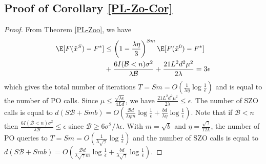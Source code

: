 \noindent\subsection{Proof of Corollary \ref{PL-Zo-Cor}}
\begin{proof}
From Theorem \ref{PL-Zoo}, we have
\begin{align}
\E[F(\tilde{x}^S) - {F}^*] & \leq   \left(1-\frac{\lambda\eta}{3}\right)^{Sm} \E[F(\tilde{x}^0) - {F}^*] \notag\\
&+ \frac{6I(\mathcal{B} < n) \sigma ^2}{\lambda\mathcal{B}}+\frac{21 L^2 d^2 \mu^2}{2\lambda}= 3 \epsilon\notag
\end{align}
which gives the total number of iterations $T = Sm = O(\frac{1}{\lambda\eta}\log\frac{1}{\epsilon})$ and is equal to the number of PO calls. Since $\mu \leq \frac{\sqrt{\lambda\epsilon}}{4 L d}$, we have $\frac{21 L^2 d^2 \mu^2}{2\lambda} \leq \epsilon$. The number of SZO calls is equal to $d(S\mathcal{B}+Smb) = O(\frac{\mathcal{B}d}{\lambda\eta m}\log\frac{1}{\epsilon}+\frac{bd}{\lambda\eta}\log\frac{1}{\epsilon})$.  Note that if $\mathcal{B} < n$ then $\frac{6I(\mathcal{B} < n) \sigma ^2}{\lambda\mathcal{B}} \leq \epsilon$ since $\mathcal{B} \geq 6 {\sigma ^2}/{\lambda \epsilon}$. With $m=\sqrt{b}$ and $\eta = \frac{\sqrt{\gamma}}{12 L}$, the number of PO  queries to $T = Sm = O(\frac{1}{\lambda\sqrt{\gamma}}\log\frac{1}{\epsilon})$ and the number of SZO calls is equal to $d(S\mathcal{B}+Smb) = O(\frac{\mathcal{B}d}{\lambda\sqrt{\gamma} m}\log\frac{1}{\epsilon}+\frac{bd}{\lambda\sqrt{\gamma}}\log\frac{1}{\epsilon})$.
\end{proof}

